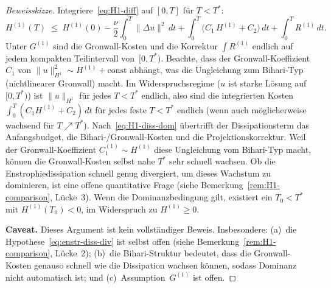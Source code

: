 \documentclass[12pt,a4paper]{article}
\theoremstyle{definition}
\theoremstyle{plain}
\theoremstyle{remark}
\begin{document}
\begin{proof}[Beweisskizze]
Integriere~\eqref{eq:H1-diff} auf $[0,T]$ für $T < T^*$:
\[
  H^{(1)}(T)
  \;\le\;
  H^{(1)}(0)
  - \frac{\nu}{2}\int_0^T\|\Delta u\|^2\,dt
  + \int_0^T\!\bigl(C_1\, H^{(1)} + C_2\bigr)\,dt
  + \int_0^T R^{(1)}\,dt.
\]
Unter $G^{(1)}$ sind die Gronwall-Kosten und die Korrektur $\int R^{(1)}$
endlich auf jedem kompakten Teilintervall von~$[0,T^*)$.
Beachte, dass der Gronwall-Koeffizient $C_1$ von
$\|u\|_{H^1}^2 \sim H^{(1)} + \mathrm{const}$ abhängt, was die
Ungleichung zum Bihari-Typ (nichtlinearer Gronwall) macht. Im
Widerspruchsregime ($u$ ist starke Lösung auf $[0,T^*)$) ist
$\|u\|_{H^1}$ für jedes $T < T^*$ endlich, also sind die integrierten Kosten
$\int_0^T(C_1 H^{(1)} + C_2)\,dt$ für jedes feste $T < T^*$ endlich
(wenn auch möglicherweise wachsend für $T \nearrow T^*$).
Nach~\eqref{eq:H1-diss-dom} übertrifft der Dissipationsterm das Anfangsbudget,
die Bihari-/Gronwall-Kosten und die Projektionskorrektur. Weil der
Gronwall-Koeffizient $C_1^{(1)}\sim H^{(1)}$ diese Ungleichung vom
Bihari-Typ macht, können die Gronwall-Kosten selbst nahe $T^*$ sehr schnell
wachsen. Ob die Enstrophiedissipation schnell genug divergiert, um dieses
Wachstum zu dominieren, ist eine offene quantitative Frage
(siehe Bemerkung~\ref{rem:H1-comparison}, Lücke~3). Wenn die Dominanzbedingung
gilt, existiert ein $T_0<T^*$ mit $H^{(1)}(T_0)<0$, im Widerspruch zu
$H^{(1)}\ge0$.

\medskip\noindent
\textbf{Caveat.}\; Dieses Argument ist kein vollständiger Beweis. Insbesondere:
(a)~die Hypothese~\eqref{eq:enstr-diss-div} ist selbst offen
(siehe Bemerkung~\ref{rem:H1-comparison}, Lücke~2);
(b)~die Bihari-Struktur bedeutet, dass die Gronwall-Kosten genauso schnell wie
die Dissipation wachsen können, sodass Dominanz nicht automatisch ist; und
(c)~Assumption~$G^{(1)}$ ist offen.
\end{proof}
\end{document}
